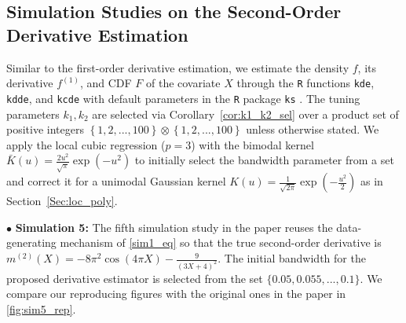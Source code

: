 \documentclass{uwstat572}
\theoremstyle{definition}
\theoremstyle{theorem}
\begin{document}
\subsection{Simulation Studies on the Second-Order Derivative Estimation}

Similar to the first-order derivative estimation, we estimate the density $f$, its derivative $f^{(1)}$, and CDF $F$ of the covariate $X$ through the \texttt{R} functions \texttt{kde}, \texttt{kdde}, and \texttt{kcde} with default parameters in the \texttt{R} package \texttt{ks} \citep{ks2022R}. The tuning parameters $k_1,k_2$ are selected via Corollary~\ref{cor:k1_k2_sel} over a product set of positive integers $\left\{1,2,...,100\right\}\otimes \left\{1,2,...,100\right\}$ unless otherwise stated. We apply the local cubic regression ($p=3$) with the bimodal kernel $\bar{K}(u)=\frac{2u^2}{\sqrt{\pi}} \exp\left(-u^2\right)$ to initially select the bandwidth parameter from a set and correct it for a unimodal Gaussian kernel $K(u)=\frac{1}{\sqrt{2\pi}} \exp\left(-\frac{u^2}{2}\right)$ as in Section~\ref{Sec:loc_poly}.

$\bullet$ {\bf Simulation 5:} The fifth simulation study in the paper \citep{liu2020smoothed} reuses the data-generating mechanism of \eqref{sim1_eq} so that the true second-order derivative is $m^{(2)}(X) = -8\pi^2 \cos\left(4\pi X\right) - \frac{9}{(3X+4)^2}$. The initial bandwidth for the proposed derivative estimator is selected from the set $\{0.05, 0.055,...,0.1\}$. We compare our reproducing figures with the original ones in the paper in \autoref{fig:sim5_rep}.
\end{document}
